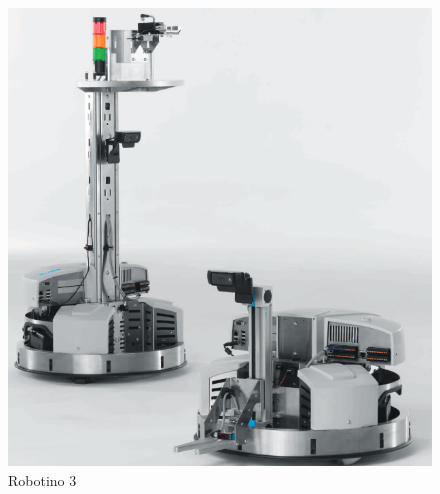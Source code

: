            \begin{figure}[H]
                \centering
                \includegraphics[scale=0.3]{Figures/RobotinoFESTO_base+torre.png}                 
                    \caption{Robotino 3 \cite{festo-didactic-robotino-2013}}
                    \label{fig:Robotino}
            \end{figure}
            
